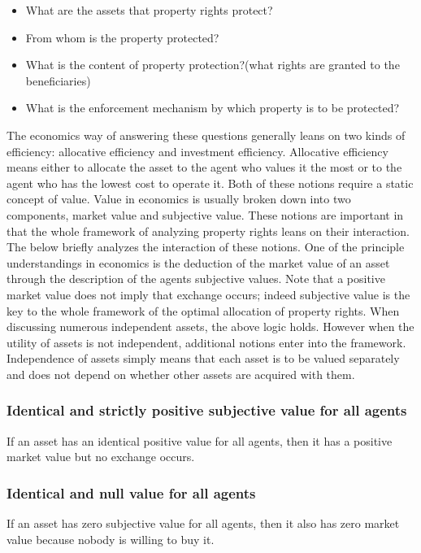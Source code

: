 \begin{itemize}
  \item What are the assets that property rights protect?
  \item From whom is the property protected?
  \item What is the content of property protection?(what rights are granted to the beneficiaries)
  \item What is the enforcement mechanism by which property is to be protected?  
\end{itemize}

The economics way of answering these questions generally leans on two kinds of efficiency: allocative efficiency and investment efficiency. Allocative efficiency means either to allocate the asset to the agent who values it the most or to the agent who has the lowest cost to operate it. Both of these notions require a static concept of value. Value in economics is usually broken down into two components, market value and subjective value. These notions are important in that the whole framework of analyzing property rights leans on their interaction. The below briefly analyzes the interaction of these notions. One of the principle understandings in economics is the deduction of the market value of an asset through the description of the agents subjective values. Note that a positive market value does not imply that exchange occurs; indeed subjective value is the key to the whole framework of the optimal allocation of property rights. When discussing numerous independent assets, the above logic holds. However when the utility of assets is not independent, additional notions enter into the framework. Independence of assets simply means that each asset is to be valued separately and does not depend on whether other assets are acquired with them.


\subsubsection{Identical and strictly positive subjective value for all agents}

If an asset has an identical positive value for all agents, then it has a positive market value but no exchange occurs.

\subsubsection{Identical and null value for all agents}

If an asset has zero subjective value for all agents, then it also has zero market value because nobody is willing to buy it.

